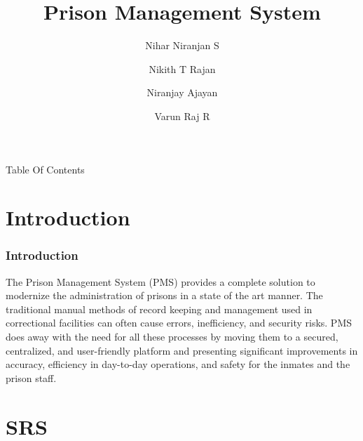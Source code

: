 \documentclass[aspectratio=169]{beamer}
\title{Prison Management System}
\author{Nihar Niranjan S \and Nikith T Rajan \and Niranjay Ajayan \and Varun Raj R}
\institute{
	Department of Computer Engineering\\
	Model Engineering College\\
	Thrikkakara, Kochi 682021\\
}
\begin{document}
\begin{frame}[plain]
    \maketitle
\end{frame}
\begin{frame}{Table Of Contents}
    \tableofcontents
    
\end{frame}
\section{Introduction}
\begin{frame}
    \frametitle{Introduction}
    The Prison Management System (PMS) provides a complete solution to modernize the administration of prisons in a state of the art manner. The traditional manual methods of record keeping and management used in correctional facilities can often cause errors, inefficiency, and security risks. PMS does away with the need for all these processes by moving them to a secured, centralized, and user-friendly platform and presenting significant improvements in accuracy, efficiency in day-to-day operations, and safety for the inmates and the prison staff.
\end{frame}
\section{SRS}
\end{document}
